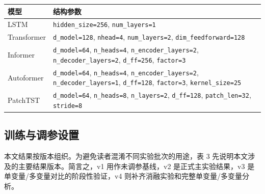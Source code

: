 {\def\LTcaptype{none} %
\begin{longtable}[]{@{}
  >{\raggedright\arraybackslash}p{}
  >{\raggedright\arraybackslash}p{}@{}}
\toprule\noalign{}
\begin{minipage}[b]{\linewidth}\raggedright
模型
\end{minipage} & \begin{minipage}[b]{\linewidth}\raggedright
结构参数
\end{minipage} \\
\midrule\noalign{}
\endhead
\bottomrule\noalign{}
\endlastfoot
LSTM & \texttt{hidden\_size=256}, \texttt{num\_layers=1} \\
Transformer & \texttt{d\_model=128}, \texttt{nhead=4}, \texttt{num\_layers=2}, \texttt{dim\_feedforward=128} \\
Informer & \texttt{d\_model=64}, \texttt{n\_heads=4}, \texttt{n\_encoder\_layers=2}, \texttt{n\_decoder\_layers=2}, \texttt{d\_ff=256}, \texttt{factor=3} \\
Autoformer & \texttt{d\_model=64}, \texttt{n\_heads=4}, \texttt{n\_encoder\_layers=2}, \texttt{n\_decoder\_layers=1}, \texttt{d\_ff=128}, \texttt{factor=3}, \texttt{kernel\_size=25} \\
PatchTST & \texttt{d\_model=64}, \texttt{n\_heads=8}, \texttt{n\_layers=2}, \texttt{d\_ff=128}, \texttt{patch\_len=32}, \texttt{stride=8} \\
\end{longtable}
}

\subsection{训练与调参设置}\label{ux8badux7ec3ux4e0eux8c03ux53c2ux8bbeux7f6e}

本文结果按版本组织。为避免读者混淆不同实验批次的用途，表 3 先说明本文涉及的主要结果版本。简言之，v1 用作未调参基线，v2 是正式主实验结果，v3 是单变量/多变量对比的阶段性验证，v4 则补齐消融实验和完整单变量/多变量分析。

